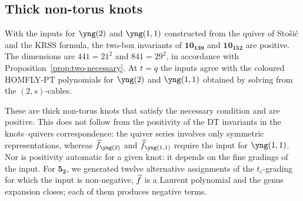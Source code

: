 \subsection{Thick non-torus knots}
\begin{compresult}\label{cr:thick}
With the inputs for $\yng(2)$ and $\yng(1,1)$ constructed from the quiver of Sto\v{s}i\'c and the KRSS formula, the two-box invariants of $\mathbf{10_{139}}$ and $\mathbf{10_{152}}$ are positive.
The dimensions are $441=21^2$ and $841=29^2$, in accordance with Proposition~\ref{prop:two-necessary}.
At $t=q$ the inputs agree with the coloured HOMFLY-PT polynomials for $\yng(2)$ and $\yng(1,1)$ obtained by solving from the $(2,s)$-cables.
\end{compresult}
These are thick non-torus knots that satisfy the necessary condition and are positive.
This does not follow from the positivity of the DT invariants in the knots--quivers correspondence:
the quiver series involves only symmetric representations, whereas $\hf_{\yng(2)}$ and $\hf_{\yng(1,1)}$ require the input for $\yng(1,1)$.
Nor is positivity automatic for a given knot: it depends on the fine gradings of the input.
For $\mathbf{5_2}$, we generated twelve alternative assignments of the $t_c$-grading for which the input is non-negative, $\widehat{f}$ is a Laurent polynomial and the genus expansion closes; each of them produces negative terms.

